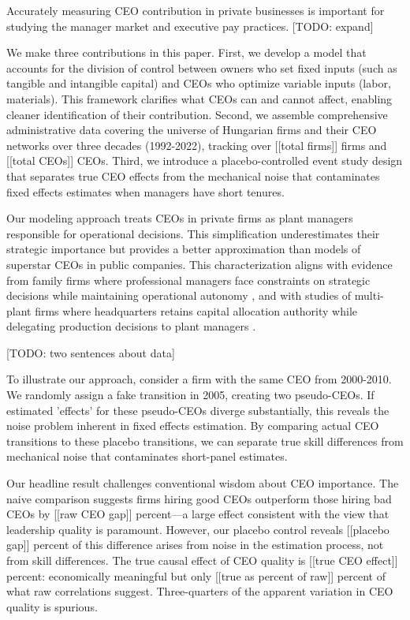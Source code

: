\documentclass[11pt,a4paper]{article}
\begin{document}
Accurately measuring CEO contribution in private businesses is important for studying the manager market and executive pay practices. [TODO: expand]

We make three contributions in this paper. First, we develop a model that accounts for the division of control between owners who set fixed inputs (such as tangible and intangible capital) and CEOs who optimize variable inputs (labor, materials). This framework clarifies what CEOs can and cannot affect, enabling cleaner identification of their contribution. Second, we assemble comprehensive administrative data covering the universe of Hungarian firms and their CEO networks over three decades (1992-2022), tracking over [[total firms]] firms and [[total CEOs]] CEOs. Third, we introduce a placebo-controlled event study design that separates true CEO effects from the mechanical noise that contaminates fixed effects estimates when managers have short tenures.

Our modeling approach treats CEOs in private firms as plant managers responsible for operational decisions. This simplification underestimates their strategic importance but provides a better approximation than models of superstar CEOs in public companies. This characterization aligns with evidence from family firms where professional managers face constraints on strategic decisions while maintaining operational autonomy \citep{zellweger2012managing}, and with studies of multi-plant firms where headquarters retains capital allocation authority while delegating production decisions to plant managers \citep{bloom2012americans}.

[TODO: two sentences about data]

To illustrate our approach, consider a firm with the same CEO from 2000-2010. We randomly assign a fake transition in 2005, creating two pseudo-CEOs. If estimated 'effects' for these pseudo-CEOs diverge substantially, this reveals the noise problem inherent in fixed effects estimation. By comparing actual CEO transitions to these placebo transitions, we can separate true skill differences from mechanical noise that contaminates short-panel estimates.

Our headline result challenges conventional wisdom about CEO importance. The naive comparison suggests firms hiring good CEOs outperform those hiring bad CEOs by [[raw CEO gap]] percent—a large effect consistent with the view that leadership quality is paramount. However, our placebo control reveals [[placebo gap]] percent of this difference arises from noise in the estimation process, not from skill differences. The true causal effect of CEO quality is [[true CEO effect]] percent: economically meaningful but only [[true as percent of raw]] percent of what raw correlations suggest. Three-quarters of the apparent variation in CEO quality is spurious.
\end{document}
